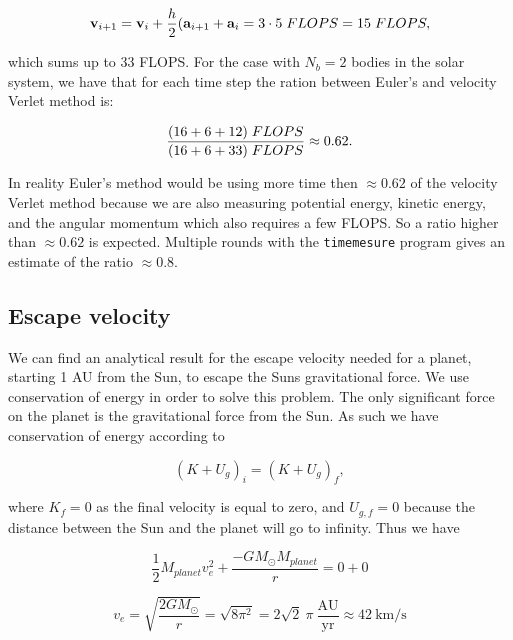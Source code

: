 \documentclass[a4paper, fontsize=11pt]{article}
\begin{document}
\begin{equation}
\textbf{v}_{i + 1} = \textbf{v}_i + \frac{h}{2}(\textbf{a}_{i+1} + \textbf{a}_i = 3 \cdot 5 \hspace{1mm} FLOPS = 15 \hspace{1mm} FLOPS,
\end{equation}

which sums up to 33 FLOPS. For the case with $N_b = 2$ bodies in the solar system, we have that for each time step the ration between Euler's and velocity Verlet method is:

\begin{equation}
\frac{(16 + 6 + 12) \hspace{1mm} FLOPS}{(16 + 6 + 33) \hspace{1mm} FLOPS} \approx 0.62.
\end{equation}

In reality Euler's method would be using more time then $\approx 0.62$ of the velocity Verlet method because we are also measuring potential energy, kinetic energy, and the angular momentum which also requires a few FLOPS. So a ratio higher than $\approx 0.62$ is expected. Multiple rounds with the \verb+timemesure+ program gives an estimate of the ratio $\approx 0.8$.


\subsection{Escape velocity}

We can find an analytical result for the escape velocity needed for a planet, starting 1 AU from the Sun, to escape the Suns gravitational force. We use conservation of energy in order to solve this problem. The only significant force on the planet is the gravitational force from the Sun. As such we have conservation of energy according to

\begin{equation}
(K + U_{g})_{i}=(K+U_{g})_{f},
\end{equation}

where $K_{f}=0$ as the final velocity is equal to zero, and $U_{g,f} = 0$ because the distance between the Sun and the planet will go to infinity. Thus we have

\begin{equation}
\dfrac{1}{2} M_{planet} v_{e}^2 + \dfrac{- G M_{\odot} M_{planet}}{r} = 0 + 0
\end{equation}

\begin{equation}
v_{e} = \sqrt{\dfrac{2 G M_{\odot}}{r}} = \sqrt{8 \pi^2}=2 \sqrt{2} \: \pi \: \frac{\text{AU}}{\text{yr}} \approx 42 \:  \text{km}/\text{s}
\end{equation}
\end{document}
